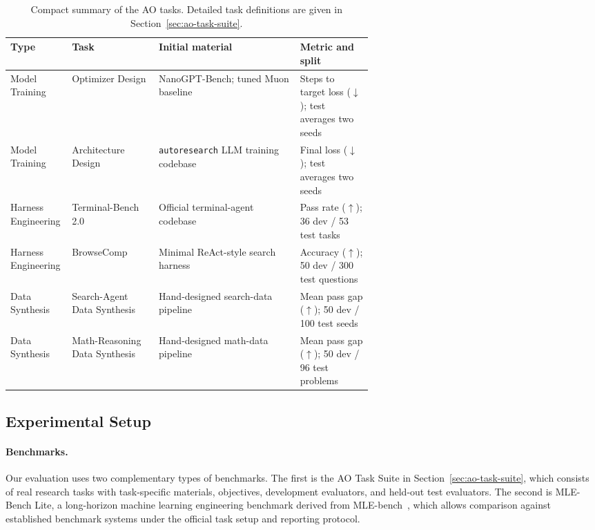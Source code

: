 \documentclass[]{selfevolagent}
\theoremstyle{plain}
\theoremstyle{definition}
\theoremstyle{remark}
\begin{document}
\begin{table}[t]
\centering
\small
\setlength{\tabcolsep}{3.0pt}
\renewcommand{\arraystretch}{1.08}
\caption{Compact summary of the AO tasks. Detailed task definitions are given in
Section~\ref{sec:ao-task-suite}.}
\label{tab:ao-tasks}
\begin{tabularx}{\linewidth}{>{\raggedright\arraybackslash}p{0.17\linewidth}>{\raggedright\arraybackslash}p{0.24\linewidth}>{\raggedright\arraybackslash}X>{\raggedright\arraybackslash}p{0.20\linewidth}}
\toprule
Type & Task & Initial material & Metric and split \\
\midrule
Model Training & Optimizer Design & NanoGPT-Bench; tuned Muon baseline & Steps to
target loss ($\downarrow$); test averages two seeds \\
Model Training & Architecture Design & \texttt{autoresearch} LLM training
codebase & Final loss ($\downarrow$); test averages two seeds \\
Harness Engineering & Terminal-Bench 2.0 & Official terminal-agent codebase &
Pass rate ($\uparrow$); 36 dev / 53 test tasks \\
Harness Engineering & BrowseComp & Minimal ReAct-style search harness &
Accuracy ($\uparrow$); 50 dev / 300 test questions \\
Data Synthesis & Search-Agent Data Synthesis & Hand-designed search-data
pipeline & Mean pass gap ($\uparrow$); 50 dev / 100 test seeds \\
Data Synthesis & Math-Reasoning Data Synthesis & Hand-designed math-data
pipeline & Mean pass gap ($\uparrow$); 50 dev / 96 test problems \\
\bottomrule
\end{tabularx}
\end{table}

\subsection{Experimental Setup}
\label{sec:exp-setup}

\paragraph{Benchmarks.}
Our evaluation uses two complementary types of benchmarks. The first is the AO
Task Suite in Section~\ref{sec:ao-task-suite}, which consists of real research
tasks with task-specific materials, objectives, development evaluators, and
held-out test evaluators. The second is MLE-Bench Lite, a long-horizon machine
learning engineering benchmark derived from MLE-bench~\citep{mlebench}, which
allows comparison against established benchmark systems under the official task
setup and reporting protocol. 
\end{document}
